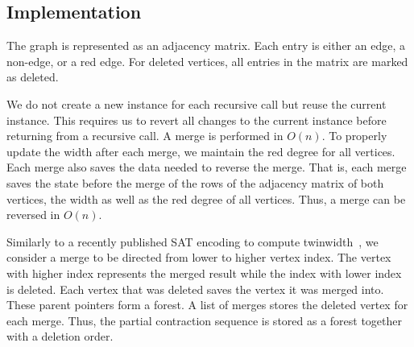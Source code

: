 \documentclass[a4paper,UKenglish,cleveref, autoref, thm-restate]{lipics-v2021}
\begin{document}
\subsection{Implementation}
The graph is represented as an adjacency matrix.
Each entry is either an edge, a non-edge, or a red edge.
For deleted vertices, all entries in the matrix are marked as deleted.

We do not create a new instance for each recursive call but reuse the current instance.
This requires us to revert all changes to the current instance before returning from a recursive call.
A merge is performed in $O(n)$.
To properly update the width after each merge, we maintain the red degree for all vertices.
Each merge also saves the data needed to reverse the merge.
That is, each merge saves the state before the merge of the rows of the adjacency matrix of both vertices, the width as well as the red degree of all vertices.
Thus, a merge can be reversed in $O(n)$.

Similarly to a recently published SAT encoding to compute twinwidth~\cite{schidler2022sat}, we consider a merge to be directed from lower to higher vertex index.
The vertex with higher index represents the merged result while the index with lower index is deleted.
Each vertex that was deleted saves the vertex it was merged into.
These parent pointers form a forest. 
A list of merges stores the deleted vertex for each merge.
Thus, the partial contraction sequence is stored as a forest together with a deletion order.





\end{document}
